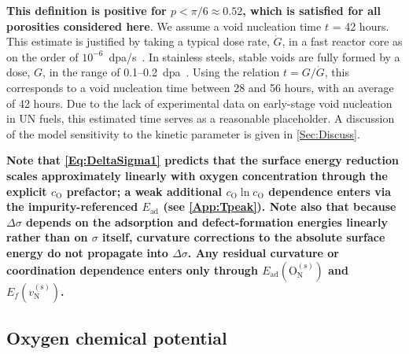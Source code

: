 \documentclass[preprint,12pt,sort&compress]{elsarticle}
\newcommand{\?}{\stackrel{?}{=}}
\providecommand{\DIFaddtex}[1]{{\bf #1}} %
\providecommand{\DIFaddbegin}{\protect\color{blue}} %
\providecommand{\DIFaddend}{\protect\color{black}} %
\providecommand{\DIFadd}[1]{\texorpdfstring{\DIFaddtex{#1}}{#1}} %
\begin{document}
\DIFadd{This definition is positive for $p<\pi/6\approx0.52$, which is satisfied for all porosities considered here}\DIFaddend . We assume a void nucleation time $t$ = 42 hours. This estimate is justified by taking a typical dose rate, $\dot{G}$, in a fast reactor core as on the order of $10^{-6}$~dpa/s~\cite{Mansur1983, Saha2018}. In stainless steels, stable voids are fully formed by a dose, $G$, in the range of 0.1--0.2~dpa~\cite{Surh2004}. Using the relation $t = G / \dot{G}$, this corresponds to a void nucleation time between 28 and 56 hours, with an average of 42 hours. Due to the lack of experimental data on early-stage void nucleation in UN fuels, this estimated time serves as a reasonable placeholder. A discussion of the model sensitivity to the kinetic parameter is given in \cref{Sec:Discuss}.

\DIFaddbegin \DIFadd{Note that \cref{Eq:DeltaSigma1} predicts that the surface energy reduction scales approximately linearly with oxygen concentration through the explicit $c_\text{O}$ prefactor; a weak additional $c_\text{O}\ln c_\text{O}$ dependence enters via the impurity-referenced $E_\text{ad}$ (see \ref{App:Tpeak}). Note also that because $\Delta \sigma$ depends on the adsorption and defect-formation energies linearly rather than on $\sigma$ itself, curvature corrections to the absolute surface energy do not propagate into $\Delta \sigma$. Any residual curvature or coordination dependence enters only through $E_\text{ad}(\text{O}_\text{N}^{(\text{s})})$ and $E_f(v_\text{N}^{(\text{s})})$.
}

\DIFaddend \subsection{Oxygen chemical potential}
\label{Sec:uO}
\end{document}
